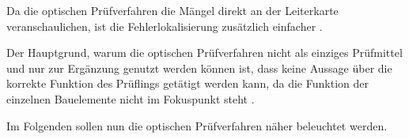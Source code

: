     Da die optischen Prüfverfahren die Mängel direkt an der Leiterkarte veranschaulichen, ist die Fehlerlokalisierung zusätzlich einfacher \cite{berger_test-_2012}.

    Der Hauptgrund, warum die optischen Prüfverfahren nicht als einziges Prüfmittel und nur zur Ergänzung genutzt werden können ist, dass keine Aussage über die korrekte Funktion des Prüflings getätigt werden kann, da die Funktion der einzelnen Bauelemente nicht im Fokuspunkt steht \cite{berger_test-_2012}.

    Im Folgenden sollen nun die optischen Prüfverfahren näher beleuchtet werden.


    